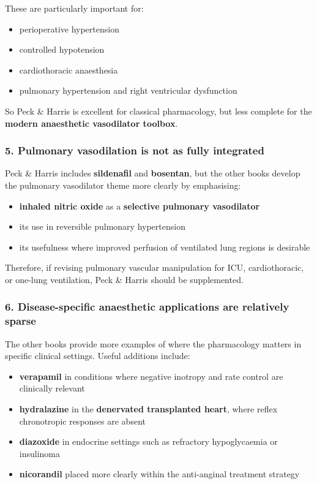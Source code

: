 \documentclass[11pt,a4paper]{article}
\begin{document}
These are particularly important for:
\begin{itemize}
    \item perioperative hypertension
    \item controlled hypotension
    \item cardiothoracic anaesthesia
    \item pulmonary hypertension and right ventricular dysfunction
\end{itemize}

So Peck \& Harris is excellent for classical pharmacology, but less complete for the \textbf{modern anaesthetic vasodilator toolbox}.

\subsubsection*{5. Pulmonary vasodilation is not as fully integrated}
Peck \& Harris includes \textbf{sildenafil} and \textbf{bosentan}, but the other books develop the pulmonary vasodilator theme more clearly by emphasising:
\begin{itemize}
    \item \textbf{inhaled nitric oxide} as a \textbf{selective pulmonary vasodilator}
    \item its use in reversible pulmonary hypertension
    \item its usefulness where improved perfusion of ventilated lung regions is desirable
\end{itemize}

Therefore, if revising pulmonary vascular manipulation for ICU, cardiothoracic, or one-lung ventilation, Peck \& Harris should be supplemented.

\subsubsection*{6. Disease-specific anaesthetic applications are relatively sparse}
The other books provide more examples of where the pharmacology matters in specific clinical settings. Useful additions include:
\begin{itemize}
    \item \textbf{verapamil} in conditions where negative inotropy and rate control are clinically relevant
    \item \textbf{hydralazine} in the \textbf{denervated transplanted heart}, where reflex chronotropic responses are absent
    \item \textbf{diazoxide} in endocrine settings such as refractory hypoglycaemia or insulinoma
    \item \textbf{nicorandil} placed more clearly within the anti-anginal treatment strategy
\end{itemize}
\end{document}
